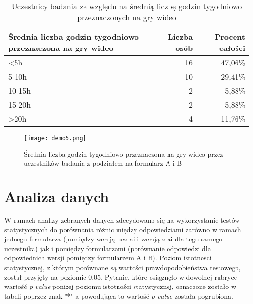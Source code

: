 \begin{table}[h!]
    \begin{center}
        \begin{tabular}{|m{15em}|r|r|}
            \hline
            Średnia liczba godzin tygodniowo \newline przeznaczona na gry wideo & Liczba osób & Procent całości \\
            \hline
            <5h                                                                 & 16          & 47,06\%         \\
            5-10h                                                               & 10          & 29,41\%         \\
            10-15h                                                              & 2           & 5,88\%          \\
            15-20h                                                              & 2           & 5,88\%          \\
            >20h                                                                & 4           & 11,76\%         \\
            \hline
        \end{tabular}
    \end{center}
    \caption{Uczestnicy badania ze względu na średnią liczbę godzin tygodniowo przeznaczonych na gry wideo}\label{tab1:ch7_5}
\end{table}

\begin{figure}[h!]
    \centering
    \texttt{[image: demo5.png]}
    \caption{Średnia liczba godzin tygodniowo przeznaczona na gry wideo przez uczestników badania z podziałem na formularz A i B}
    \label{fig:ch7_demo5}
\end{figure}

\newpage

\section{Analiza danych}\label{section:ch7_2}

W ramach analizy zebranych danych zdecydowano się na wykorzystanie testów statystycznych do porównania różnic między
odpowiedziami zarówno w ramach jednego formularza (pomiędzy wersją bez \gls{ai} i wersją z \gls{ai} dla tego samego uczestnika)
jak i pomiędzy formularzami (porównanie odpowiedzi dla odpowiednich wersji pomiędzy formularzem A i B). Poziom
istotności statystycznej, z którym porównane są wartości prawdopodobieństwa testowego, został przyjęty na poziomie 0,05.
Pytanie, które osiągnęło w dowolnej rubryce wartość \textit{p value} poniżej poziomu istotności statystycznej,
oznaczone zostało w tabeli poprzez znak "*" a powodująca to wartość \textit{p value} została pogrubiona.

